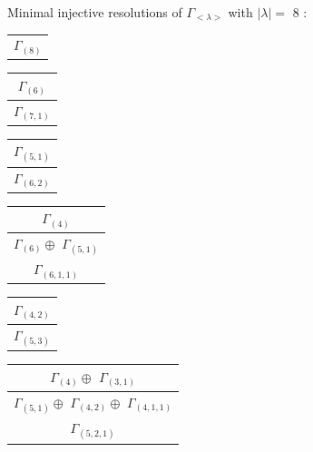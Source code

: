 \documentclass[main.tex]{subfiles}
\begin{document}
Minimal injective resolutions of $\Gamma_{<\lambda>}$ with $|\lambda| = $ 8 : \\
\begin{minipage}{.2\textwidth}
\centering
\begin{tabular}{c}
$\Gamma_{(
8
)}$
\\
\end{tabular}\end{minipage}
\begin{minipage}{.2\textwidth}
\centering
\begin{tabular}{c}
$\Gamma_{(
6
)}$
\\ \hline
$\Gamma_{(
7 , 
1
)}$
\\
\end{tabular}\end{minipage}
\begin{minipage}{.2\textwidth}
\centering
\begin{tabular}{c}
$\Gamma_{(
5 , 
1
)}$
\\ \hline
$\Gamma_{(
6 , 
2
)}$
\\
\end{tabular}\end{minipage}
\begin{minipage}{.2\textwidth}
\centering
\begin{tabular}{c}
$\Gamma_{(
4
)}$
\\ \hline
$\Gamma_{(
6
)} \oplus$
$\Gamma_{(
5 , 
1
)}$
\\ \hline
$\Gamma_{(
6 , 
1 , 
1
)}$
\\
\end{tabular}\end{minipage}
\begin{minipage}{.2\textwidth}
\centering
\begin{tabular}{c}
$\Gamma_{(
4 , 
2
)}$
\\ \hline
$\Gamma_{(
5 , 
3
)}$
\\
\end{tabular}\end{minipage}
\bigskip
\begin{minipage}{.3\textwidth}
\centering
\begin{tabular}{c}
$\Gamma_{(
4
)} \oplus$
$\Gamma_{(
3 , 
1
)}$
\\ \hline
$\Gamma_{(
5 , 
1
)} \oplus$
$\Gamma_{(
4 , 
2
)} \oplus$
$\Gamma_{(
4 , 
1 , 
1
)}$
\\ \hline
$\Gamma_{(
5 , 
2 , 
1
)}$
\\
\end{tabular}\end{minipage}
\end{document}
